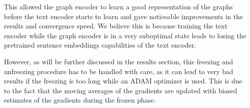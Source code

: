 \documentclass[switch, 11pt]{article}
\begin{document}
\begin{multicols}{2}
    This allowed the graph encoder to learn a good representation of the graphs before the text encoder starts to learn and gave noticeable improvements in the results and convergence speed. We believe this is because training the text encoder while the graph encoder is in a very suboptimal state leads to losing the pretrained sentence embeddings capabilities of the text encoder.

    However, as will be further discussed in the results section, this freezing and unfreezing procedure has to be handled with care, as it can lead to very bad results if the freezing is too long while an ADAM optimizer is used. This is due to the fact that the moving averages of the gradients are updated with biased estimates of the gradients during the frozen phase.

\end{multicols}
\end{document}

